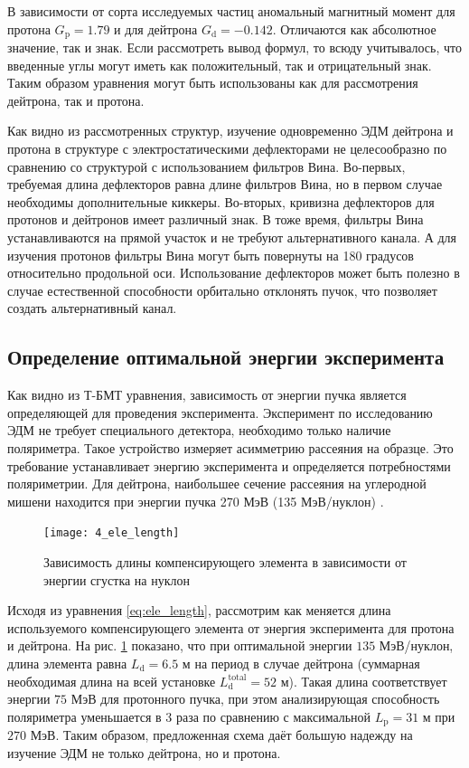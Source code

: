 \par В зависимости от сорта исследуемых частиц аномальный магнитный момент для протона $G_{\textrm{p}}=1.79$ и для дейтрона $G_{\textrm{d}}=-0.142$. Отличаются как абсолютное значение, так и знак. Если рассмотреть вывод формул, то всюду учитывалось, что введенные углы могут иметь как положительный, так и отрицательный знак. Таким образом уравнения могут быть использованы как для рассмотрения дейтрона, так и протона. 

\par  Как видно из рассмотренных структур, изучение одновременно ЭДМ дейтрона и протона в структуре с электростатическими дефлекторами не целесообразно по сравнению со структурой с использованием фильтров Вина. Во-первых, требуемая длина дефлекторов равна длине фильтров Вина, но в первом случае необходимы дополнительные киккеры. Во-вторых, кривизна дефлекторов для протонов и дейтронов имеет различный знак. В тоже время, фильтры Вина устанавливаются на прямой участок и не требуют альтернативного канала. А для изучения протонов фильтры Вина могут быть повернуты на 180 градусов относительно продольной оси. Использование дефлекторов может быть полезно в случае естественной способности орбитально отклонять пучок, что позволяет создать альтернативный канал.

	\subsection{Определение оптимальной энергии эксперимента}\label{sec:EDM/requirements/energy}
\par Как видно из Т-БМТ уравнения, зависимость от энергии пучка является определяющей для проведения эксперимента.  Эксперимент по исследованию ЭДМ не требует специального детектора, необходимо только наличие поляриметра. Такое устройство измеряет асимметрию рассеяния на образце. Это требование устанавливает энергию эксперимента и определяется потребностями поляриметрии. Для дейтрона, наибольшее сечение рассеяния на углеродной мишени находится при энергии пучка 270 МэВ (135 МэВ/нуклон) \cite{JEDI:polarimeter, skhomenko:polarimeter}.

\begin{figure}[!h]
  \centering
	\texttt{[image: 4\_ele\_length]}
   \caption{Зависимость длины компенсирующего элемента в зависимости от энергии сгустка на нуклон}
   \label{fig:4_ele_length}
\end{figure}

\par Исходя из уравнения \ref{eq:ele_length}, рассмотрим как меняется длина используемого компенсирующего элемента от энергия эксперимента для протона и дейтрона. На рис. \ref{fig:4_ele_length} показано, что при оптимальной энергии $135$ МэВ/нуклон, длина элемента равна $L_{\textrm{d}} = 6.5$ м на период в случае дейтрона (суммарная необходимая длина на всей установке $L^{\textrm{total}}_{\textrm{d}} = 52$ м). Такая длина соответствует энергии $75$ МэВ для протонного пучка, при этом анализирующая способность поляриметра уменьшается в 3 раза \cite{mcnaughton:polarimeter} по сравнению с максимальной $L_{\textrm{p}} = 31$ м при $270$ МэВ. Таким образом, предложенная схема даёт большую надежду на изучение ЭДМ не только дейтрона, но и протона.
	
